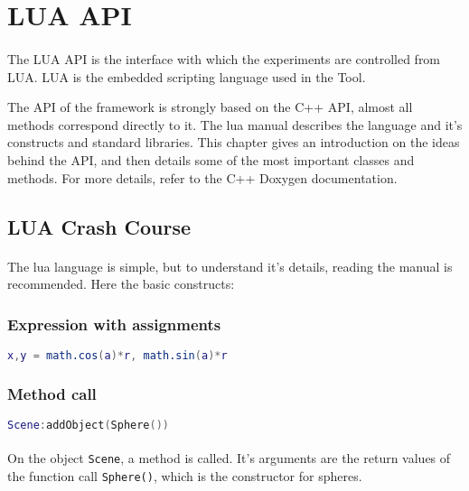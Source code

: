 \section{LUA API}
\paragraph{}
The LUA API is the interface with which the experiments are controlled from LUA.
LUA is the embedded scripting language used in the Tool.

The API of the framework is strongly based on the C++ API, almost all methods correspond directly to it.
The lua manual\cite{lua} describes the language and it's constructs and standard libraries.
This chapter gives an introduction on the ideas behind the API, and then details some of the most important classes and methods. For more details, refer to the C++ Doxygen documentation.


\subsection{LUA Crash Course}
\paragraph{}
The lua language is simple, but to understand it's details, reading the manual\cite{lua} is recommended.
Here the basic constructs:

\subsubsection{Expression with assignments}

\begin{lstlisting}[language=lua]
x,y = math.cos(a)*r, math.sin(a)*r
\end{lstlisting}

\subsubsection{Method call}
\begin{lstlisting}[language=lua]
Scene:addObject(Sphere())
\end{lstlisting}

\paragraph{}
On the object  \texttt{Scene}, a method is called. It's arguments are the return values of the function call \texttt{Sphere()}, which is the constructor for spheres.


